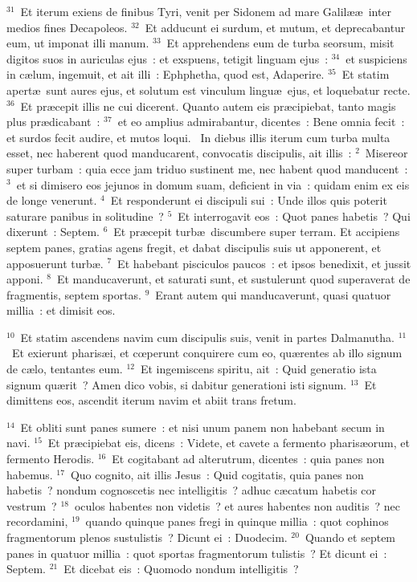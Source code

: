 ${}^{31}$~Et iterum exiens de finibus Tyri, venit per Sidonem ad mare Galil\ae \ae\ inter medios fines Decapoleos.
${}^{32}$~Et adducunt ei surdum, et mutum, et deprecabantur eum, ut imponat illi manum.
${}^{33}$~Et apprehendens eum de turba seorsum, misit digitos suos in auriculas ejus~: et exspuens, tetigit linguam ejus~:
${}^{34}$~et suspiciens in c\ae lum, ingemuit, et ait illi~: Ephphetha, quod est, Adaperire.
${}^{35}$~Et statim apert\ae\ sunt aures ejus, et solutum est vinculum lingu\ae\ ejus, et loquebatur recte.
${}^{36}$~Et pr\ae cepit illis ne cui dicerent. Quanto autem eis pr\ae cipiebat, tanto magis plus pr\ae dicabant~:
${}^{37}$~et eo amplius admirabantur, dicentes~: Bene omnia fecit~: et surdos fecit audire, et mutos loqui.
~In diebus illis iterum cum turba multa esset, nec haberent quod manducarent, convocatis discipulis, ait illis~:
${}^{2}$~Misereor super turbam~: quia ecce jam triduo sustinent me, nec habent quod manducent~:
${}^{3}$~et si dimisero eos jejunos in domum suam, deficient in via~: quidam enim ex eis de longe venerunt.
${}^{4}$~Et responderunt ei discipuli sui~: Unde illos quis poterit saturare panibus in solitudine~?
${}^{5}$~Et interrogavit eos~: Quot panes habetis~? Qui dixerunt~: Septem.
${}^{6}$~Et pr\ae cepit turb\ae\ discumbere super terram. Et accipiens septem panes, gratias agens fregit, et dabat discipulis suis ut apponerent, et apposuerunt turb\ae .
${}^{7}$~Et habebant pisciculos paucos~: et ipsos benedixit, et jussit apponi.
${}^{8}$~Et manducaverunt, et saturati sunt, et sustulerunt quod superaverat de fragmentis, septem sportas.
${}^{9}$~Erant autem qui manducaverunt, quasi quatuor millia~: et dimisit eos.


${}^{10}$~Et statim ascendens navim cum discipulis suis, venit in partes Dalmanutha.
${}^{11}$~Et exierunt pharis\ae i, et cœperunt conquirere cum eo, qu\ae rentes ab illo signum de c\ae lo, tentantes eum.
${}^{12}$~Et ingemiscens spiritu, ait~: Quid generatio ista signum qu\ae rit~? Amen dico vobis, si dabitur generationi isti signum.
${}^{13}$~Et dimittens eos, ascendit iterum navim et abiit trans fretum.


${}^{14}$~Et obliti sunt panes sumere~: et nisi unum panem non habebant secum in navi.
${}^{15}$~Et pr\ae cipiebat eis, dicens~: Videte, et cavete a fermento pharis\ae orum, et fermento Herodis.
${}^{16}$~Et cogitabant ad alterutrum, dicentes~: quia panes non habemus.
${}^{17}$~Quo cognito, ait illis Jesus~: Quid cogitatis, quia panes non habetis~? nondum cognoscetis nec intelligitis~? adhuc c\ae catum habetis cor vestrum~?
${}^{18}$~oculos habentes non videtis~? et aures habentes non auditis~? nec recordamini,
${}^{19}$~quando quinque panes fregi in quinque millia~: quot cophinos fragmentorum plenos sustulistis~? Dicunt ei~: Duodecim.
${}^{20}$~Quando et septem panes in quatuor millia~: quot sportas fragmentorum tulistis~? Et dicunt ei~: Septem.
${}^{21}$~Et dicebat eis~: Quomodo nondum intelligitis~?



